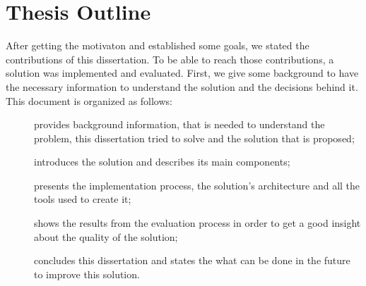 \section{Thesis Outline}
\label{sec:introduction_thesis_outline}
After getting the motivaton and established some goals, we stated the contributions of this dissertation.
To be able to reach those contributions, a solution was implemented and evaluated.
First, we give some background to have the necessary information to understand the solution and the decisions behind it.
This document is organized as follows:
\begin{description}
  \item[]
  provides background information, that is needed to understand the problem, this dissertation tried to solve and the solution that is proposed;
  \item[]
  introduces the solution and describes its main components;
  \item[]
  presents the implementation process, the solution's architecture and all the tools used to create it;
  \item[]
  shows the results from the evaluation process in order to get a good insight about the quality of the solution;
  \item[]
  concludes this dissertation and states the what can be done in the future to improve this solution.
\end{description}
